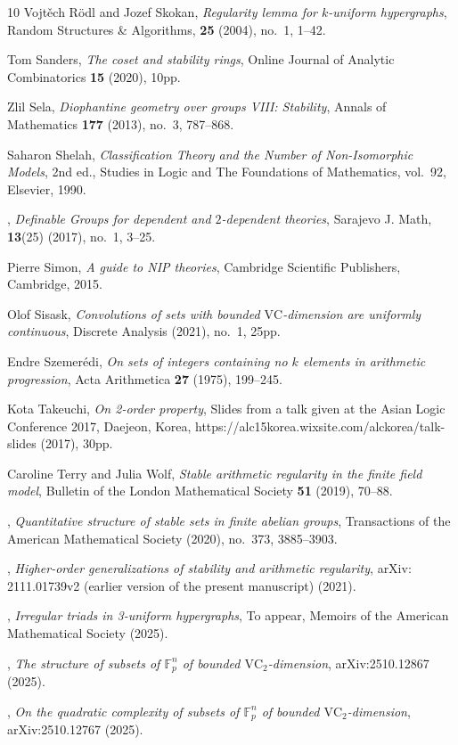\documentclass[12pt,oneside,british,a4wide]{amsart}
\numberwithin{equation}{section}
\theoremstyle{definition}
\def\F{\mathbb{F}}
\def\VC{\mathrm{VC}}
\begin{document}
\begin{thebibliography}{10}
Vojt\v{e}ch R\"{o}dl and Jozef Skokan,
\emph{{Regularity lemma for {$k$}-uniform hypergraphs}}, Random Structures \& Algorithms,
  \textbf{25} (2004), no.~1, 1--42.


Tom Sanders, \emph{{The coset and stability rings}}, Online Journal of Analytic
  Combinatorics \textbf{15} (2020), 10pp.

Zlil Sela, \emph{{Diophantine geometry over groups VIII: Stability}}, Annals of
  Mathematics \textbf{177} (2013), no.~3, 787--868.

Saharon Shelah, \emph{{Classification Theory and the Number of Non-Isomorphic
  Models}}, 2nd ed., Studies in Logic and The Foundations of Mathematics,
  vol.~92, Elsevier, 1990.
  
\bysame, \emph{{Definable Groups for dependent and $2$-dependent theories}}, Sarajevo J. Math, \textbf{13}(25) (2017), no.~1, 3--25.

Pierre Simon, \emph{{A guide to NIP theories}}, Cambridge Scientific Publishers, Cambridge, 2015. 

Olof Sisask, \emph{{Convolutions of sets with bounded $\VC$-dimension are
  uniformly continuous}}, Discrete Analysis (2021), no.~1, 25pp.

Endre Szemer\'edi, \emph{{On sets of integers containing no $k$ elements in arithmetic progression}}, Acta Arithmetica \textbf{27} (1975), 199--245.


Kota Takeuchi, \emph{{On 2-order property}}, Slides from a talk given at the
  Asian Logic Conference 2017, Daejeon, Korea,
  https://alc15korea.wixsite.com/alckorea/talk-slides (2017), 30pp.


Caroline Terry and Julia Wolf, \emph{{Stable arithmetic regularity in the
  finite field model}}, Bulletin of the London Mathematical Society \textbf{51}
  (2019), 70--88.

\bysame, \emph{{Quantitative structure of stable sets in finite abelian
  groups}}, Transactions of the American Mathematical Society (2020), no.~373,
  3885--3903.
 

\bysame, \emph{{Higher-order generalizations of stability and arithmetic regularity}}, arXiv: 2111.01739v2 (earlier version of the present manuscript) (2021).

\bysame, \emph{{Irregular triads in 3-uniform hypergraphs}}, To appear, Memoirs of the American Mathematical Society (2025).

\bysame, \emph{{The structure of subsets of $\F_p^n$ of bounded $\VC_2$-dimension}}, arXiv:2510.12867 (2025).

\bysame, \emph{{On the quadratic complexity of subsets of $\F_p^n$ of bounded $\VC_2$-dimension}}, arXiv:2510.12767 (2025).


\end{thebibliography}
\end{document}
